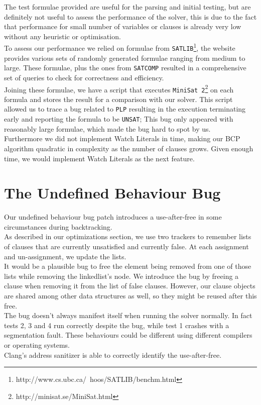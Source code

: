 \documentclass[a4paper]{article}
\begin{document}
The test formulae provided are useful for the parsing and initial testing, but are definitely not useful to assess the performance of the solver, this is due to the fact that performance for small number of variables or clauses is already very low without any heuristic or optimisation. \\
To assess our performance we relied on formulae from \texttt{SATLIB}\footnote{http://www.cs.ubc.ca/~hoos/SATLIB/benchm.html}, the website provides various sets of randomly generated formulae ranging from medium to large.
These formulae, plus the ones from \texttt{SATCOMP} resulted in a comprehensive set of queries to check for correctness and efficiency. \\
Joining these formulae, we have a script that executes \texttt{MiniSat 2}\footnote{http://minisat.se/MiniSat.html} on each formula and stores the result for a comparison with our solver.
This script allowed us to trace a bug related to \texttt{PLP} resulting in the execution terminating early and reporting the formula to be \texttt{UNSAT}; This bug only appeared with reasonably large formulae, which made the bug hard to spot by us. \\
Furthermore we did not implement Watch Literals in time, making our BCP algorithm quadratic in complexity as the number of clauses grows. Given enough time, we would implement Watch Literals as the next feature.\\


\section{The Undefined Behaviour Bug}

Our undefined behaviour bug patch introduces a use-after-free in some circumstances during backtracking.\\
As described in our optimizations section, we use two trackers to remember lists of clauses that are currently unsatisfied and currently false. At each assignment and un-assignment, we update the lists.\\
It would be a plausible bug to free the element being removed from one of those lists while removing the linkedlist's node. We introduce the bug by freeing a clause when removing it from the list of false clauses. However, our clause objects are shared among other data structures as well, so they might be reused after this free.\\
The bug doesn't always manifest itself when running the solver normally. In fact tests 2, 3 and 4 run correctly despite the bug, while test 1 crashes with a segmentation fault. These behaviours could be different using different compilers or operating systems.\\
Clang's address sanitizer is able to correctly identify the use-after-free.
\end{document}
